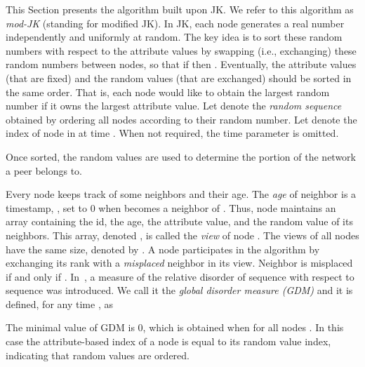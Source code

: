 \documentclass[times,10pt,twocolumn]{article}
\newcommand{\remove}[1]{}
\begin{document}

This Section presents the algorithm built upon JK. 
We refer to this algorithm as \emph{mod-JK} (standing for modified JK).
In JK,
each node 
 generates a real number  independently and uniformly at random.
The key idea is to sort these random numbers with 
respect to the attribute values by swapping (i.e., exchanging) these random numbers between nodes,
so that if  then . 
Eventually,  the attribute values (that are fixed) and the 
random values (that are exchanged)  should be sorted in the same order.
That is, each node would like to obtain the  largest random number if 
it owns the  largest attribute value.
Let  denote the \emph{random sequence} obtained 
by ordering all nodes according to their random number.
Let  denote the index of node  in  at time
. When not required, the time parameter is omitted.


\remove{
To illustrate the above ideas, consider that nodes 1, 2, and 3 
from the previous example
have three
distinct random values: , , and .
In this case, the index  of node  would be . Since the
attribute values are , , and , the algorithm
must achieve the following final assignment of random numbers: ,
, and .
} 

Once sorted, the random values are used to determine the portion of the network a peer belongs to.


Every node  keeps track of some neighbors and their age. 
The \emph{age} of neighbor  is a timestamp, , set to 0 when  becomes a 
neighbor of .
Thus, node  maintains an array
containing the id, the age,
the attribute value, and the 
random value of its neighbors.  This array, denoted , is 
called the \emph{view} of node .
The views of all nodes have the same size, denoted by .  
A node  participates in the algorithm by exchanging its rank with a \emph{misplaced} 
neighbor in its view.  Neighbor  is misplaced 
if and only if
.
In~\cite{JK06}, a measure of the relative
disorder of sequence  with respect to sequence
 was introduced. We call it the 
\emph{global disorder measure (GDM)} and it is defined, for any time , as

The minimal value of GDM is 0, which is obtained
when  for all nodes .  In this case the 
attribute-based index of a node is equal to its random value index, indicating
that random values are ordered.

\end{document}
